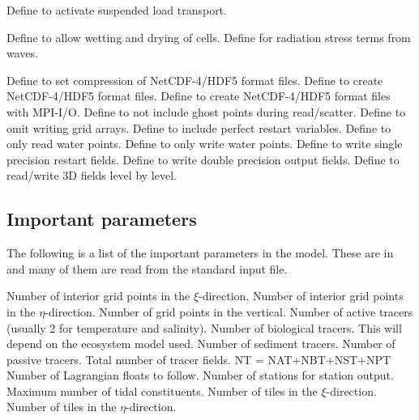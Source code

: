 \begin{klist}
\begin{klist}
     Define to activate suspended load transport.
  \end{klist}
   \mbox{}
  \begin{klist}
     Define to allow wetting and drying of cells.
     Define for radiation stress terms from
    waves.
  \end{klist}
   \mbox{}
  \begin{klist}
     Define to set compression of NetCDF-4/HDF5 format files.
     Define to create NetCDF-4/HDF5 format files.
     Define to create NetCDF-4/HDF5 format files
    with MPI-I/O.
     Define to not include ghost points during
    read/scatter.
     Define to omit writing grid arrays.
     Define to include perfect restart variables.
     Define to only read water points.
     Define to only write water points.
     Define to write single precision restart fields.
     Define to write double precision output fields.
     Define to read/write 3D fields level by level.
  \end{klist}
\end{klist}

\subsection{Important parameters}
\label{Parms}
The following is a list of the important parameters in the model. These
are in  and many of them are read from the standard
input file.
\begin{klist}
   Number of interior grid points in the $\xi$-direction.
   Number of interior grid points in the $\eta$-direction.
   Number of grid points in the vertical.
   Number of active tracers (usually 2 for temperature and
    salinity).
   Number of biological tracers. This will depend on the
    ecosystem model used.
   Number of sediment tracers.
   Number of passive tracers.
   Total number of tracer fields. NT = NAT+NBT+NST+NPT
   Number of Lagrangian floats to follow.
   Number of stations for station output.
   Maximum number of tidal constituents.
   Number of tiles in the $\xi$-direction.
   Number of tiles in the $\eta$-direction.
\end{klist}


